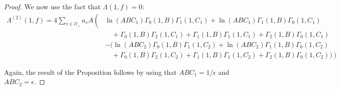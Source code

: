 \documentclass{article}
\theoremstyle{plain}
\begin{document}
\begin{proof}
We now use the fact that $\Lambda(1,f)=0$:
\begin{equation*}
\begin{split}
\Lambda^{(2)}(1,f)= 4 \sum_{v \in \mathcal{O}_+} a_v A \left( \right. &  \ln(ABC_1) \Gamma_0(1,B)\Gamma_1(1,C_1) +  \ln(ABC_1) \Gamma_1(1,B)\Gamma_0(1,C_1) \\
&\quad +  \Gamma_0(1,B)\Gamma_2(1,C_1) +  \Gamma_1(1,B)\Gamma_1(1,C_1)+  \Gamma_2(1,B)\Gamma_0(1,C_1)\\
& - ( \ln(ABC_2) \Gamma_0(1,B)\Gamma_1(1,C_2)+  \ln(ABC_2) \Gamma_1(1,B)\Gamma_0(1,C_2)  \\
& \quad +  \Gamma_0(1,B)\Gamma_2(1,C_2) +  \Gamma_1(1,B)\Gamma_1(1,C_2)+  \Gamma_2(1,B)\Gamma_0(1,C_2)) \left.\right)
\end{split}
\end{equation*}

Again, the result of the Proposition follows by using that $ABC_1=1/\epsilon$ and $ABC_2=\epsilon$.

\end{proof}




\end{document}
